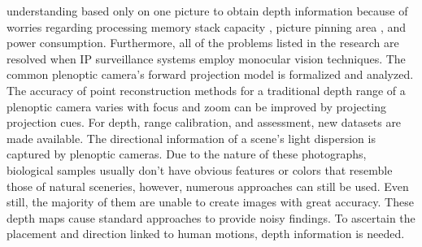 \documentclass[sn-mathphys]{sn-jnl}%
\theoremstyle{thmstyleone}%
\theoremstyle{thmstyletwo}%
\theoremstyle{thmstylethree}%
\begin{document}
understanding based only on one picture to obtain depth information because of worries regarding processing memory stack capacity \cite{bib7}, picture pinning area \cite{bib6}, and power consumption. Furthermore, all of the problems listed in the research are resolved when IP surveillance systems employ monocular vision techniques.
The common plenoptic camera's forward projection model is formalized and analyzed. The accuracy of point reconstruction methods for a traditional depth range of a plenoptic camera varies with focus and zoom can be improved by projecting projection cues. For depth, range calibration, and assessment, new datasets are made available. The directional information of a scene's light dispersion is captured by plenoptic cameras. \cite{bib8} Due to the nature of these photographs, biological samples usually don't have obvious features or colors that resemble those of natural sceneries, however, numerous approaches can still be used. Even still, the majority of them are unable to create images with great accuracy. These depth maps cause standard approaches to provide noisy findings. \cite{bib9} To ascertain the placement and direction linked to human motions, depth information is needed.
\end{document}
